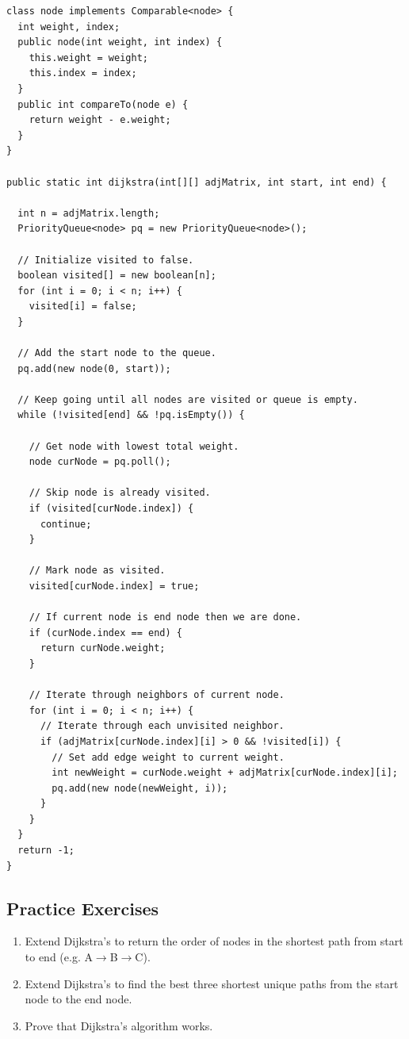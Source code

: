 \documentclass[11pt,oneside]{book}
\begin{document}
\begin{lstlisting}
class node implements Comparable<node> {
  int weight, index;
  public node(int weight, int index) {
    this.weight = weight;
    this.index = index;
  }
  public int compareTo(node e) {
    return weight - e.weight;
  }
}

public static int dijkstra(int[][] adjMatrix, int start, int end) {

  int n = adjMatrix.length;
  PriorityQueue<node> pq = new PriorityQueue<node>();

  // Initialize visited to false.
  boolean visited[] = new boolean[n];
  for (int i = 0; i < n; i++) {
    visited[i] = false;
  }

  // Add the start node to the queue.
  pq.add(new node(0, start));

  // Keep going until all nodes are visited or queue is empty.
  while (!visited[end] && !pq.isEmpty()) {

    // Get node with lowest total weight.
    node curNode = pq.poll();

    // Skip node is already visited.
    if (visited[curNode.index]) {
      continue;
    }

    // Mark node as visited.
    visited[curNode.index] = true;

    // If current node is end node then we are done.
    if (curNode.index == end) {
      return curNode.weight;
    }

    // Iterate through neighbors of current node.
    for (int i = 0; i < n; i++) {
      // Iterate through each unvisited neighbor.
      if (adjMatrix[curNode.index][i] > 0 && !visited[i]) {
        // Set add edge weight to current weight.
        int newWeight = curNode.weight + adjMatrix[curNode.index][i];
        pq.add(new node(newWeight, i));
      }
    }
  }
  return -1;
}
\end{lstlisting}

\subsection{Practice Exercises}

\begin{enumerate}
\item Extend Dijkstra's to return the order of nodes in the shortest path from start to end (e.g. A$\to$B$\to$C).
\item Extend Dijkstra's to find the best three shortest unique paths from the start node to the end node.
\item Prove that Dijkstra's algorithm works.
\end{enumerate}
\end{document}
